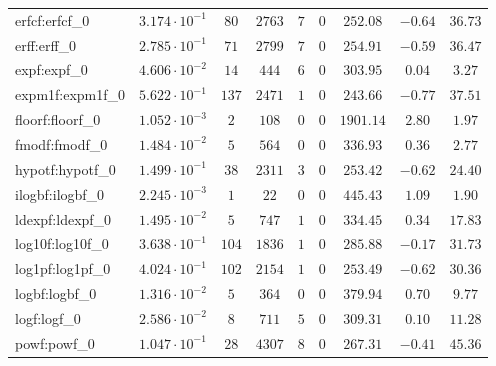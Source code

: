 \begin{tabular}{|l|c|c|c|c|c|c|c|c|}
erfcf:erfcf\_0               & $ 3.174 \cdot 10^{-1} $ & $ 80     $ & $ 2763  $ & $ 7   $ & $ 0   $ & $ 252.08      $ & $ -0.64   $ & $ 36.73   $ \\
erff:erff\_0                 & $ 2.785 \cdot 10^{-1} $ & $ 71     $ & $ 2799  $ & $ 7   $ & $ 0   $ & $ 254.91      $ & $ -0.59   $ & $ 36.47   $ \\
expf:expf\_0                 & $ 4.606 \cdot 10^{-2} $ & $ 14     $ & $ 444   $ & $ 6   $ & $ 0   $ & $ 303.95      $ & $ 0.04    $ & $ 3.27    $ \\
expm1f:expm1f\_0             & $ 5.622 \cdot 10^{-1} $ & $ 137    $ & $ 2471  $ & $ 1   $ & $ 0   $ & $ 243.66      $ & $ -0.77   $ & $ 37.51   $ \\
floorf:floorf\_0             & $ 1.052 \cdot 10^{-3} $ & $ 2      $ & $ 108   $ & $ 0   $ & $ 0   $ & $ 1901.14     $ & $ 2.80    $ & $ 1.97    $ \\
fmodf:fmodf\_0               & $ 1.484 \cdot 10^{-2} $ & $ 5      $ & $ 564   $ & $ 0   $ & $ 0   $ & $ 336.93      $ & $ 0.36    $ & $ 2.77    $ \\
hypotf:hypotf\_0             & $ 1.499 \cdot 10^{-1} $ & $ 38     $ & $ 2311  $ & $ 3   $ & $ 0   $ & $ 253.42      $ & $ -0.62   $ & $ 24.40   $ \\
ilogbf:ilogbf\_0             & $ 2.245 \cdot 10^{-3} $ & $ 1      $ & $ 22    $ & $ 0   $ & $ 0   $ & $ 445.43      $ & $ 1.09    $ & $ 1.90    $ \\
ldexpf:ldexpf\_0             & $ 1.495 \cdot 10^{-2} $ & $ 5      $ & $ 747   $ & $ 1   $ & $ 0   $ & $ 334.45      $ & $ 0.34    $ & $ 17.83   $ \\
log10f:log10f\_0             & $ 3.638 \cdot 10^{-1} $ & $ 104    $ & $ 1836  $ & $ 1   $ & $ 0   $ & $ 285.88      $ & $ -0.17   $ & $ 31.73   $ \\
log1pf:log1pf\_0             & $ 4.024 \cdot 10^{-1} $ & $ 102    $ & $ 2154  $ & $ 1   $ & $ 0   $ & $ 253.49      $ & $ -0.62   $ & $ 30.36   $ \\
logbf:logbf\_0               & $ 1.316 \cdot 10^{-2} $ & $ 5      $ & $ 364   $ & $ 0   $ & $ 0   $ & $ 379.94      $ & $ 0.70    $ & $ 9.77    $ \\
logf:logf\_0                 & $ 2.586 \cdot 10^{-2} $ & $ 8      $ & $ 711   $ & $ 5   $ & $ 0   $ & $ 309.31      $ & $ 0.10    $ & $ 11.28   $ \\
powf:powf\_0                 & $ 1.047 \cdot 10^{-1} $ & $ 28     $ & $ 4307  $ & $ 8   $ & $ 0   $ & $ 267.31      $ & $ -0.41   $ & $ 45.36   $ \\

\end{tabular}
